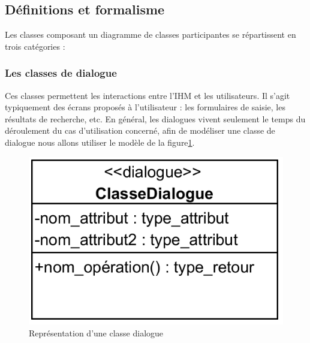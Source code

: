         \subsection{Définitions et formalisme}
        Les classes composant un diagramme de classes participantes se répartissent en trois catégories :\cite{6}
        
        \subsubsection{Les classes de dialogue}
        Ces classes permettent les interactions entre l’IHM et les utilisateurs. Il s’agit typiquement des écrans proposés à l’utilisateur : les formulaires de saisie, les résultats de recherche, etc. En général, les dialogues vivent seulement le temps du déroulement du cas d’utilisation concerné, afin de modéliser une classe de dialogue nous allons utiliser le modèle de la figure\ref{fig20}.
        
            \begin{figure}[h!]
                 \centering
                \includegraphics[scale=1.5]{images/dialogue.png}
                 \caption{Représentation d'une classe dialogue}
                 \label{fig20}
            \end{figure}
        
